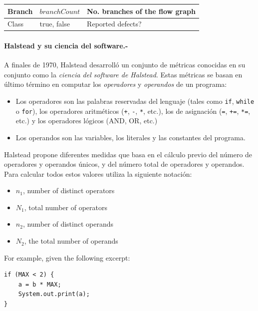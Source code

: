 \documentclass[]{book}
\providecommand{\tightlist}{%
  \setlength{\itemsep}{0pt}\setlength{\parskip}{0pt}}
\let\oldparagraph\paragraph
\renewcommand{\paragraph}[1]{\oldparagraph{#1}\mbox{}}
\theoremstyle{definition}
\theoremstyle{definition}
\theoremstyle{remark}
\begin{document}
\begin{table}
\begin{center}
\begin{small}
\begin{tabular}{l|l|p{6cm}}
\hline
     Branch    &   $branchCount$  &  No. branches of the flow graph \\
\hline
     Class  &      {true, false}  &  Reported defects? \\
\hline
\end{tabular}
\end{small}
\end{center}
\end{table}

\paragraph{Halstead y su ciencia del software.-}

A finales de 1970, Halstead desarrolló un conjunto de métricas conocidas
en su conjunto como la \emph{ciencia del software de
Halstead}. Estas métricas se basan en último término en computar los
\emph{operadores} y \emph{operandos} de un programa:

\begin{itemize}
  \item Los operadores son las palabras reservadas del
  lenguaje (tales como \texttt{if}, \texttt{while} o
\texttt{for}), los operadores aritméticos (\texttt{+},
\texttt{-}, \texttt{*}, etc.), los de asignación
(\texttt{=}, \texttt{+=}, \texttt{*=}, etc.) y los
operadores lógicos (AND, OR, etc.)
  \item Los operandos son las variables, los literales y las constantes del
programa.
\end{itemize}

Halstead propone diferentes medidas que basa en el cálculo previo del
número de operadores y operandos únicos, y del número total de
operadores y operandos. Para calcular todos estos valores utiliza la
siguiente notación:

\begin{itemize}
\tightlist
\item
  \(n_1\), number of distinct operators
\item
  \(N_1\), total number of operators
\item
  \(n_2\), number of distinct operands
\item
  \(N_2\), the total number of operands
\end{itemize}

For example, given the following excerpt:

\begin{verbatim}
if (MAX < 2) {
    a = b * MAX;
    System.out.print(a);
}
\end{verbatim}
\end{document}
